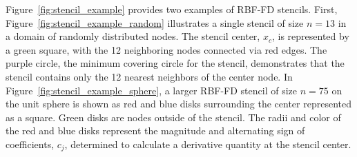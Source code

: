 \documentclass[11pt]{report}
\begin{document}
{Figure~\ref{fig:stencil_example} provides two examples of RBF-FD stencils. First, Figure~\ref{fig:stencil_example_random} illustrates a single stencil of size $n=13$ in a domain of randomly distributed nodes. The stencil center, $x_c$, is represented by a green square, with the 12 neighboring nodes connected via red edges. The purple circle, the minimum covering circle for the stencil, demonstrates that the stencil contains only the 12 nearest neighbors of the center node. In Figure~\ref{fig:stencil_example_sphere}, a larger RBF-FD stencil of size $n=75$ on the unit sphere is shown as red and blue disks surrounding the center represented as a square. Green disks are nodes outside of the stencil. The radii and color of the red and blue disks represent the magnitude and alternating sign of coefficients, $c_j$, determined to calculate a derivative quantity at the stencil center. 

}
\end{document}
